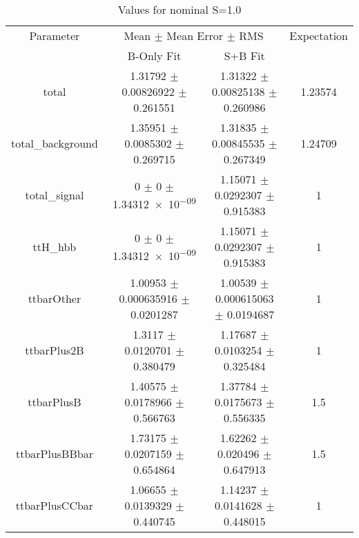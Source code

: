 \begin{table}
\centering
\caption{Values for nominal S=1.0}
\begin{tabular}{cccc}
\toprule
Parameter & \multicolumn{2}{c}{Mean $\pm$ Mean Error $\pm$ RMS} & Expectation\\
 & B-Only Fit & S+B Fit & \\
\midrule
total & \num{1.31792} $\pm$ \num{0.00826922} $\pm$ \num{0.261551} & \num{1.31322} $\pm$ \num{0.00825138} $\pm$ \num{0.260986} & \num{1.23574}\\
total\_background & \num{1.35951} $\pm$ \num{0.0085302} $\pm$ \num{0.269715} & \num{1.31835} $\pm$ \num{0.00845535} $\pm$ \num{0.267349} & \num{1.24709}\\
total\_signal & \num{0} $\pm$ \num{0} $\pm$ \num{1.34312e-09} & \num{1.15071} $\pm$ \num{0.0292307} $\pm$ \num{0.915383} & \num{1}\\
ttH\_hbb & \num{0} $\pm$ \num{0} $\pm$ \num{1.34312e-09} & \num{1.15071} $\pm$ \num{0.0292307} $\pm$ \num{0.915383} & \num{1}\\
ttbarOther & \num{1.00953} $\pm$ \num{0.000635916} $\pm$ \num{0.0201287} & \num{1.00539} $\pm$ \num{0.000615063} $\pm$ \num{0.0194687} & \num{1}\\
ttbarPlus2B & \num{1.3117} $\pm$ \num{0.0120701} $\pm$ \num{0.380479} & \num{1.17687} $\pm$ \num{0.0103254} $\pm$ \num{0.325484} & \num{1}\\
ttbarPlusB & \num{1.40575} $\pm$ \num{0.0178966} $\pm$ \num{0.566763} & \num{1.37784} $\pm$ \num{0.0175673} $\pm$ \num{0.556335} & \num{1.5}\\
ttbarPlusBBbar & \num{1.73175} $\pm$ \num{0.0207159} $\pm$ \num{0.654864} & \num{1.62262} $\pm$ \num{0.020496} $\pm$ \num{0.647913} & \num{1.5}\\
ttbarPlusCCbar & \num{1.06655} $\pm$ \num{0.0139329} $\pm$ \num{0.440745} & \num{1.14237} $\pm$ \num{0.0141628} $\pm$ \num{0.448015} & \num{1}\\
\bottomrule
\end{tabular}
\end{table}